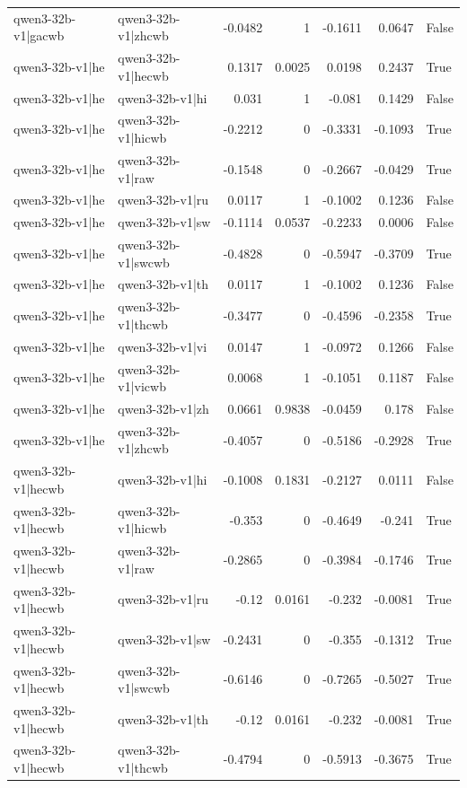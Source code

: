 \begin{table}
\begin{tabular}{l l r r r r l}
qwen3-32b-v1|gacwb & qwen3-32b-v1|zhcwb & -0.0482 & 1 & -0.1611 & 0.0647 & False \\
qwen3-32b-v1|he & qwen3-32b-v1|hecwb & 0.1317 & 0.0025 & 0.0198 & 0.2437 & True \\
qwen3-32b-v1|he & qwen3-32b-v1|hi & 0.031 & 1 & -0.081 & 0.1429 & False \\
qwen3-32b-v1|he & qwen3-32b-v1|hicwb & -0.2212 & 0 & -0.3331 & -0.1093 & True \\
qwen3-32b-v1|he & qwen3-32b-v1|raw & -0.1548 & 0 & -0.2667 & -0.0429 & True \\
qwen3-32b-v1|he & qwen3-32b-v1|ru & 0.0117 & 1 & -0.1002 & 0.1236 & False \\
qwen3-32b-v1|he & qwen3-32b-v1|sw & -0.1114 & 0.0537 & -0.2233 & 0.0006 & False \\
qwen3-32b-v1|he & qwen3-32b-v1|swcwb & -0.4828 & 0 & -0.5947 & -0.3709 & True \\
qwen3-32b-v1|he & qwen3-32b-v1|th & 0.0117 & 1 & -0.1002 & 0.1236 & False \\
qwen3-32b-v1|he & qwen3-32b-v1|thcwb & -0.3477 & 0 & -0.4596 & -0.2358 & True \\
qwen3-32b-v1|he & qwen3-32b-v1|vi & 0.0147 & 1 & -0.0972 & 0.1266 & False \\
qwen3-32b-v1|he & qwen3-32b-v1|vicwb & 0.0068 & 1 & -0.1051 & 0.1187 & False \\
qwen3-32b-v1|he & qwen3-32b-v1|zh & 0.0661 & 0.9838 & -0.0459 & 0.178 & False \\
qwen3-32b-v1|he & qwen3-32b-v1|zhcwb & -0.4057 & 0 & -0.5186 & -0.2928 & True \\
qwen3-32b-v1|hecwb & qwen3-32b-v1|hi & -0.1008 & 0.1831 & -0.2127 & 0.0111 & False \\
qwen3-32b-v1|hecwb & qwen3-32b-v1|hicwb & -0.353 & 0 & -0.4649 & -0.241 & True \\
qwen3-32b-v1|hecwb & qwen3-32b-v1|raw & -0.2865 & 0 & -0.3984 & -0.1746 & True \\
qwen3-32b-v1|hecwb & qwen3-32b-v1|ru & -0.12 & 0.0161 & -0.232 & -0.0081 & True \\
qwen3-32b-v1|hecwb & qwen3-32b-v1|sw & -0.2431 & 0 & -0.355 & -0.1312 & True \\
qwen3-32b-v1|hecwb & qwen3-32b-v1|swcwb & -0.6146 & 0 & -0.7265 & -0.5027 & True \\
qwen3-32b-v1|hecwb & qwen3-32b-v1|th & -0.12 & 0.0161 & -0.232 & -0.0081 & True \\
qwen3-32b-v1|hecwb & qwen3-32b-v1|thcwb & -0.4794 & 0 & -0.5913 & -0.3675 & True \\

\end{tabular}
\end{table}

